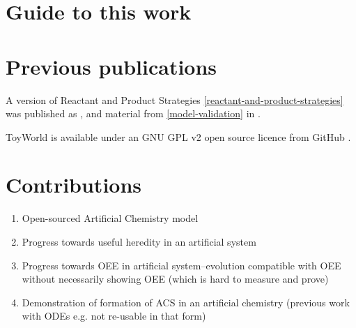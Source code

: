 \section{Guide to this work}

\section{Previous publications}\label{previous-publications}

A version of Reactant and Product Strategies \cref{reactant-and-product-strategies} was published as \cite{Young2015},
and material from \cref{model-validation} in \cite{Young2013}.

ToyWorld is available under an GNU GPL v2 open source licence from GitHub \cite{toyworld}.

\section{Contributions}\label{contributions}

\begin{enumerate}
	\item
	Open-sourced Artificial Chemistry model
	\item
	Progress towards useful heredity in an artificial system
	\item
	Progress towards OEE in artificial system--evolution compatible with
	OEE without necessarily showing OEE (which is hard to measure and
	prove)
	\item
	Demonstration of formation of ACS in an artificial chemistry (previous
	work with ODEs e.g. \autocite{Hurndall2014} not re-usable in that form)
\end{enumerate}
